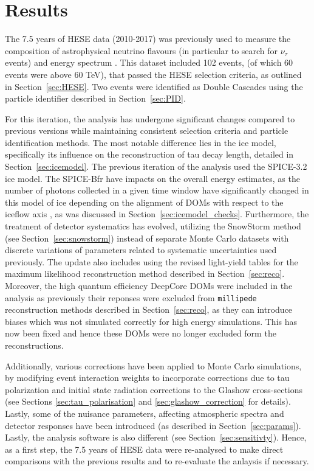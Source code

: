 \setchapterpreamble[u]{\margintoc}
\chapter{Results}
The 7.5 years of HESE data (2010-2017) was previously used to measure the composition of astrophysical neutrino flavours  (in particular to search for $\nu_{\tau}$ events) and energy spectrum . This dataset included 102 events, (of which 60 events were above 60 TeV), that passed the HESE selection criteria, as outlined in Section~\ref{sec:HESE}. Two events were identified as Double Cascades using the particle identifier described in Section~\ref{sec:PID}. 

For this iteration, the analysis has undergone significant changes compared to previous versions while maintaining consistent selection criteria and particle identification methods. The most notable difference lies in the ice model, specifically its influence on the reconstruction of tau decay length, detailed in Section~\ref{sec:icemodel}. The previous iteration of the analysis used the SPICE-3.2 ice model. The SPICE-Bfr have impacts on the overall energy estimates, as the number of photons collected in a given time window have significantly changed in this model of ice depending on the alignment of DOMs with respect to the iceflow axis , as was discussed in Section~\ref{sec:icemodel_checks}. Furthermore, the treatment of detector systematics has evolved, utilizing the SnowStorm method (see Section~\ref{sec:snowstorm}) instead of separate Monte Carlo datasets with discrete variations of parameters related to systematic uncertainties used previously. The update also includes using the revised light-yield tables  for the maximum likelihood reconstruction method described in Section~\ref{sec:reco}. Moreover, the high quantum efficiency DeepCore DOMs were included in the analysis as previously their reponses were excluded from \texttt{millipede} reconstruction methods described in Section~\ref{sec:reco}, as they can introduce biases which was not simulated correctly for high energy simulations. This has now been fixed and hence these DOMs were no longer excluded form the reconstructions.

Additionally, various corrections have been applied to Monte Carlo simulations, by modifying event interaction weights to incorporate corrections due to tau polarization and initial state radiation corrections to the Glashow cross-sections (see Sections \ref{sec:tau_polarisation} and \ref{sec:glashow_correction} for details). Lastly, some of the nuisance parameters, affecting atmospheric spectra and detector responses have been introduced (as described in Section~\ref{sec:params}). Lastly, the analysis software is also different (see Section~\ref{sec:sensitivty}). Hence, as a first step, the 7.5 years of HESE data were re-analysed to make direct comparisons with the previous results and to re-evaluate the anlaysis if necessary.

